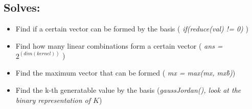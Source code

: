 \subsection{Solves:}

\begin{itemize}
	\item Find if a certain vector can be formed by the basis ( \textit{ if(reduce(val) != 0) } )
	\item Find how many linear combinations form a certain vector ( \textit{ans = $2^(dim(kernel))$} )
	\item Find the maximum vector that can be formed ( \textit{mx = max(mx, mx\^b)})
	\item Find the k-th generatable value by the basis (\textit{gaussJordan(), look at the binary representation of $K$})
\end{itemize}

